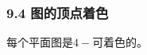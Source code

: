 \documentclass{beamer}
\begin{document}
\begin{CJK}{UTF8}{gbsn}
\begin{frame}
  \frametitle{9.4 图的顶点着色}
  \begin{theorem9.4.6}
    每个平面图是$4-$可着色的。
  \end{theorem9.4.6}
\end{frame}

\end{CJK}
\end{document}

